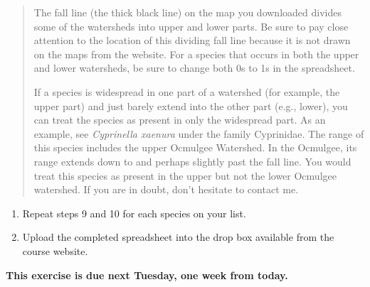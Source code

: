 \begin{quote}
The fall line (the thick black line) on the map you downloaded divides
some of the watersheds into upper and lower parts. Be sure to pay close
attention to the location of this dividing fall line because it is not
drawn on the maps from the website. For a species that occurs in both
the upper and lower watersheds, be sure to change both 0s to 1s in the
spreadsheet.

If a species is widespread in one part of a watershed (for example, the
upper part) and just barely extend into the other part (e.g., lower),
you can treat the species as present in only the widespread part. As an
example, see \emph{Cyprinella xaenura} under the family Cyprinidae. The
range of this species includes the upper Ocmulgee Watershed. In the
Ocmulgee, its range extends down to and perhaps slightly past the fall
line. You would treat this species as present in the upper but not the
lower Ocmulgee watershed. If you are in doubt, don't hesitate to contact
me.
\end{quote}

\begin{enumerate}
\def\labelenumi{\arabic{enumi})}
\item
  Repeat steps 9 and 10 for each species on your list.
\item
  Upload the completed spreadsheet into the drop box available from the
  course website.
\end{enumerate}

\textbf{This exercise is due next Tuesday, one week from today.}

